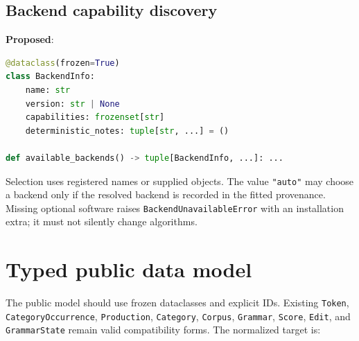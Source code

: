 \documentclass[11pt]{article}
\newcommand{\Proposed}{\textbf{Proposed}}
\begin{document}
\subsection{Backend capability discovery}

\Proposed:
\begin{lstlisting}[language=Python]
@dataclass(frozen=True)
class BackendInfo:
    name: str
    version: str | None
    capabilities: frozenset[str]
    deterministic_notes: tuple[str, ...] = ()

def available_backends() -> tuple[BackendInfo, ...]: ...
\end{lstlisting}

Selection uses registered names or supplied objects. The value
\texttt{"auto"} may choose a backend only if the resolved backend is recorded in
the fitted provenance. Missing optional software raises
\texttt{BackendUnavailableError} with an installation extra; it must not silently
change algorithms.

\section{Typed public data model}

The public model should use frozen dataclasses and explicit IDs. Existing
\texttt{Token}, \texttt{CategoryOccurrence}, \texttt{Production},
\texttt{Category}, \texttt{Corpus}, \texttt{Grammar}, \texttt{Score},
\texttt{Edit}, and \texttt{GrammarState} remain valid compatibility forms.
The normalized target is:
\end{document}
